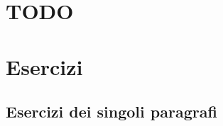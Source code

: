 
\section{TODO}

% 
% 
% 
% 
% 
% 
% 

\section{Esercizi}
\subsection{Esercizi dei singoli paragrafi}
